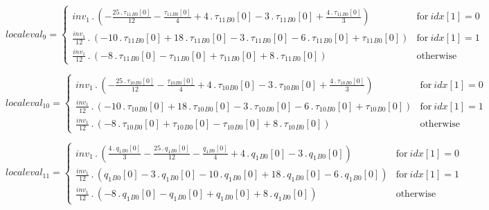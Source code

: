 \documentclass{article}
\begin{document}
\begin{dmath}localeval_{9} = \begin{cases} inv_1 \,.\, \left(- \frac{25 \,.\, {\tau_{11}{_{B0}}}[{0}]}{12} - \frac{{\tau_{11}{_{B0}}}[{0}]}{4} + 4 \,.\, {\tau_{11}{_{B0}}}[{0}] - 3 \,.\, {\tau_{11}{_{B0}}}[{0}] + \frac{4 \,.\, 
{\tau_{11}{_{B0}}}[{0}]}{3}\right) & \text{for}\: {idx}[{1}] = 0 \\\frac{inv_1}{12} \,.\, \left(- 10 \,.\, {\tau_{11}{_{B0}}}[{0}] + 18 \,.\, {\tau_{11}{_{B0}}}[{0}] - 3 \,.\, {\tau_{11}{_{B0}}}[{0}] - 6 \,.\, {\tau_{11}{_{B0}}}[{0}] + 
{\tau_{11}{_{B0}}}[{0}]\right) & \text{for}\: {idx}[{1}] = 1 \\\frac{inv_1}{12} \,.\, \left(- 8 \,.\, {\tau_{11}{_{B0}}}[{0}] - {\tau_{11}{_{B0}}}[{0}] + {\tau_{11}{_{B0}}}[{0}] + 8 \,.\, {\tau_{11}{_{B0}}}[{0}]\right) & \text{otherwise} 
\end{cases}\end{dmath}

\begin{dmath}localeval_{10} = \begin{cases} inv_1 \,.\, \left(- \frac{25 \,.\, {\tau_{10}{_{B0}}}[{0}]}{12} - \frac{{\tau_{10}{_{B0}}}[{0}]}{4} + 4 \,.\, {\tau_{10}{_{B0}}}[{0}] - 3 \,.\, {\tau_{10}{_{B0}}}[{0}] + \frac{4 \,.\, 
{\tau_{10}{_{B0}}}[{0}]}{3}\right) & \text{for}\: {idx}[{1}] = 0 \\\frac{inv_1}{12} \,.\, \left(- 10 \,.\, {\tau_{10}{_{B0}}}[{0}] + 18 \,.\, {\tau_{10}{_{B0}}}[{0}] - 3 \,.\, {\tau_{10}{_{B0}}}[{0}] - 6 \,.\, {\tau_{10}{_{B0}}}[{0}] + 
{\tau_{10}{_{B0}}}[{0}]\right) & \text{for}\: {idx}[{1}] = 1 \\\frac{inv_1}{12} \,.\, \left(- 8 \,.\, {\tau_{10}{_{B0}}}[{0}] + {\tau_{10}{_{B0}}}[{0}] - {\tau_{10}{_{B0}}}[{0}] + 8 \,.\, {\tau_{10}{_{B0}}}[{0}]\right) & \text{otherwise} 
\end{cases}\end{dmath}

\begin{dmath}localeval_{11} = \begin{cases} inv_1 \,.\, \left(\frac{4 \,.\, {q_{1}{_{B0}}}[{0}]}{3} - \frac{25 \,.\, {q_{1}{_{B0}}}[{0}]}{12} - \frac{{q_{1}{_{B0}}}[{0}]}{4} + 4 \,.\, {q_{1}{_{B0}}}[{0}] - 3 \,.\, {q_{1}{_{B0}}}[{0}]\right) & 
\text{for}\: {idx}[{1}] = 0 \\\frac{inv_1}{12} \,.\, \left({q_{1}{_{B0}}}[{0}] - 3 \,.\, {q_{1}{_{B0}}}[{0}] - 10 \,.\, {q_{1}{_{B0}}}[{0}] + 18 \,.\, {q_{1}{_{B0}}}[{0}] - 6 \,.\, {q_{1}{_{B0}}}[{0}]\right) & \text{for}\: {idx}[{1}] = 1 
\\\frac{inv_1}{12} \,.\, \left(- 8 \,.\, {q_{1}{_{B0}}}[{0}] - {q_{1}{_{B0}}}[{0}] + {q_{1}{_{B0}}}[{0}] + 8 \,.\, {q_{1}{_{B0}}}[{0}]\right) & \text{otherwise} \end{cases}\end{dmath}
\end{document}
